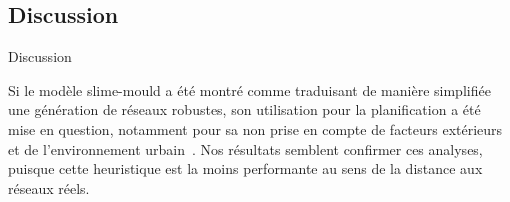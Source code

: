 
%



%
%
%
%


\subsection{Discussion}{Discussion}



Si le modèle slime-mould a été montré comme traduisant de manière simplifiée une génération de réseaux robustes, son utilisation pour la planification a été mise en question, notamment pour sa non prise en compte de facteurs extérieurs et de l'environnement urbain~\cite{adamatzky2010road}. Nos résultats semblent confirmer ces analyses, puisque cette heuristique est la moins performante au sens de la distance aux réseaux réels.










